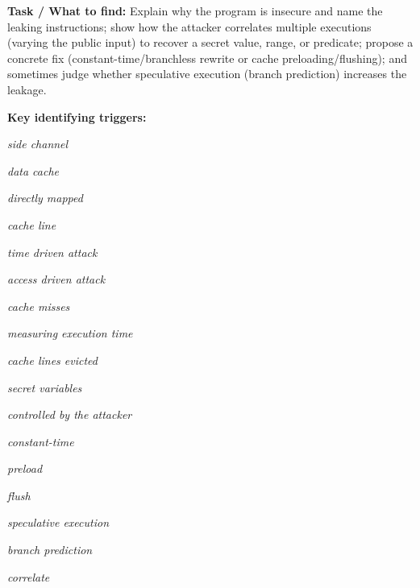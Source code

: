\documentclass[12pt, a4paper]{article}
\begin{document}
\textbf{Task / What to find:}
Explain why the program is insecure and name the leaking instructions; show how the attacker correlates multiple executions (varying the public input) to recover a secret value, range, or predicate; propose a concrete fix (constant-time/branchless rewrite or cache preloading/flushing); and sometimes judge whether speculative execution (branch prediction) increases the leakage.

\textbf{Key identifying triggers:}
\begin{tightitem}
        \item \textit{side channel}
        \item \textit{data cache}
        \item \textit{directly mapped}
        \item \textit{cache line}
        \item \textit{time driven attack}
        \item \textit{access driven attack}
        \item \textit{cache misses}
        \item \textit{measuring execution time}
        \item \textit{cache lines evicted}
        \item \textit{secret variables}
        \item \textit{controlled by the attacker}
        \item \textit{constant-time}
        \item \textit{preload}
        \item \textit{flush}
        \item \textit{speculative execution}
        \item \textit{branch prediction}
        \item \textit{correlate}
    \end{tightitem}
\end{document}
